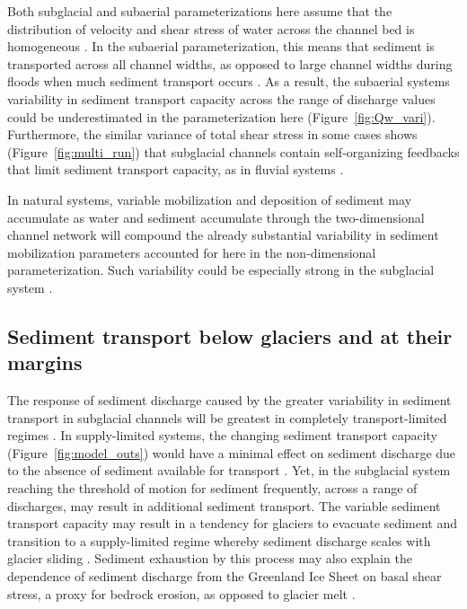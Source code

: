 \documentclass[11pt]{article}
\begin{document}
Both subglacial and subaerial parameterizations here assume that the distribution of velocity and shear stress of water across the channel bed is homogeneous \citep[Section~\ref{sect:sub_mode}~and~\ref{sect:fluv}; e.g. ]{yager2018}.
In the subaerial parameterization, this means that sediment is transported across all channel widths, as opposed to large channel widths during floods when much sediment transport occurs \citep{wolman1960}.
As a result, the  subaerial systems variability in sediment transport capacity across the range of discharge values could be underestimated in the parameterization here (Figure~\ref{fig:Qw_vari}).
Furthermore, the similar variance of total shear stress in some cases shows (Figure~\ref{fig:multi_run}) that subglacial channels contain self-organizing feedbacks that limit sediment transport capacity, as in fluvial systems \citep{phillips2016}.

In natural systems, variable mobilization and deposition of sediment may accumulate as water and sediment accumulate through the two-dimensional channel network will compound the already substantial variability in sediment mobilization parameters accounted for here in the non-dimensional parameterization.
Such variability could be especially strong in the subglacial system \citep{delaney2023}.



\subsection{Sediment transport below glaciers and at their margins}

The response of sediment discharge caused by the greater variability in sediment transport in subglacial channels will be greatest in completely transport-limited regimes \citep[e.g.][]{kasmalkar2019}.
In supply-limited systems, the changing sediment transport capacity (Figure~\ref{fig:model_outs}) would have a minimal effect on sediment discharge due to the absence of sediment available for transport \citep{delaney2019}.
Yet, in the subglacial system reaching the threshold of motion for sediment frequently, across a range of discharges,  may result in additional sediment transport.
The variable sediment transport capacity may result in a tendency for glaciers to evacuate sediment and transition to a supply-limited regime whereby sediment discharge scales with glacier sliding  \citep[e.g.][]{herman2015}.
Sediment exhaustion by this process may also explain the dependence of sediment discharge from the Greenland Ice Sheet on basal shear stress, a proxy for bedrock erosion, as opposed to glacier melt \citep{overeem2017}.
\end{document}
